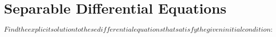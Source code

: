 \documentclass{article}
\numberwithin{equation}{section}
\numberwithin{equation}{section}
\begin{document}
\begin{subequations}
\end{subequations}

\section{Separable Differential Equations}
\begin{subequations}
Find the explicit solution to these differential equations 
that satisfy the given initial condition:
    

\end{subequations}
\end{document}
